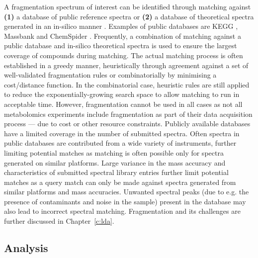 A fragmentation spectrum of interest can be identified through matching against \textbf{(1)} a database of public reference spectra or \textbf{(2)} a database of theoretical spectra generated in an in-silico manner \cite{Hufsky2014}. Examples of public databases are KEGG \cite{kotera2012kegg}, Massbank \cite{horai2010massbank} and ChemSpider \cite{pence2010chemspider}. Frequently, a combination of matching against a public database and in-silico theoretical spectra is used to ensure the largest coverage of compounds during matching. The actual matching process is often established in a greedy manner, heuristically through agreement against a set of well-validated fragmentation rules or combinatorially by minimising a cost/distance function. In the combinatorial case, heuristic rules are still applied to reduce the exponentially-growing search space to allow matching to run in acceptable time. However, fragmentation cannot be used in all cases as not all metabolomics experiments include fragmentation as part of their data acquisition process --- due to cost or other resource constraints. Publicly available databases have a limited coverage in the number of submitted spectra. Often spectra in public databases are contributed from a wide variety of instruments, further limiting potential matches as matching is often possible only for spectra generated on similar platforms. Large variance in the mass accuracy and characteristics of submitted spectral library entries further limit potential matches as a query match can only be made against spectra generated from similar platforms and mass accuracies. Unwanted spectral peaks (due to e.g. the presence of contaminants and noise in the sample) present in the database may also lead to incorrect spectral matching. Fragmentation and its challenges are further discussed in Chapter~\ref{c:lda}. 

\subsection{Analysis}

